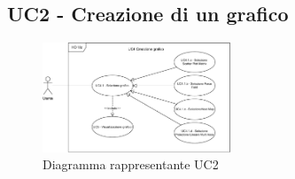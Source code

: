 \newpage
\subsection{UC2 - Creazione di un grafico}
\label{sub:uc2}

\begin{figure}[h]
    \centering
    \includegraphics[width=0.5\textwidth]{componenti/casi-duso/diagrammi/UC4.pdf}
    \caption{Diagramma rappresentante UC2}
    \label{fig:UC2}
\end{figure}


